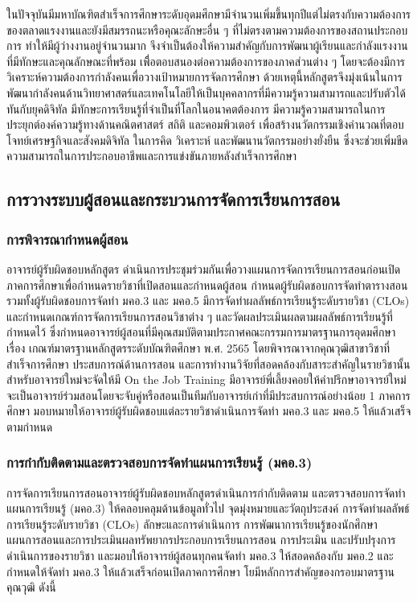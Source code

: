 ในปัจจุบันมีมหาบัณฑิตสำเร็จการศึกษาระดับอุดมศึกษามีจำนวนเพิ่มขึ้นทุกปีแต่ไม่ตรงกับความต้องการของตลาดแรงงานและยังมีสมรรถนะหรือคุณะลักษะอื่น ๆ ที่ไม่ตรงตามความต้องการของสถานประกอบการ ทำให้มีผู้ว่างงานอยู่จำนวนมาก จึงจำเป็นต้องให้ความสำคัญกับการพัฒนาผู้เรียนและกำลังแรงงานที่มีทักษะและคุณลักษณะที่พร้อม เพื่ิอตอบสนองต่อความต้องการของภาคส่วนต่าง ๆ โดยจะต้องมีการวิเคราะห์ความต้องการกำลังคนเพื่อวางเป้าหมายการจัดการศึกษา ด้วยเหตุนี้หลักสูตรจึงมุ่งเน้นในการพัฒนากำลังคนด้านวิทยาศาสตร์และเทคโนโลยีให้เป็นบุคคลากรที่มีความรู้ความสามารถและปรับตัวได้ทันกับยุคดิจิทัล มีทักษะการเรียนรู้ที่จำเป็นที่โลกในอนาคตต้องการ มีความรู้ความสามารถในการประยุกต์องค์ความรู้ทางด้านคณิตศาสตร์ สถิติ และคอมพิวเตอร์ เพื่อสร้างนวัตกรรมเชิงคำนวณที่ตอบโจทย์เศรษฐกิจและสังคมดิจิทัล ในการคิด วิเคราะห์ และพัฒนานวัตกรรมอย่างยั่งยืน ซึ่งจะช่วยเพิ่มขีดความสามารถในการประกอบอาชีพและการแข่งขันภายหลังสำเร็จการศึกษา








\subsection{การวางระบบผู้สอนและกระบวนการจัดการเรียนการสอน}
\subsubsection{การพิจารณากำหนดผู้สอน}
อาจารย์ผู้รับผิดชอบหลักสูตร ดำเนินการประชุมร่วมกันเพื่อวางแผนการจัดการเรียนการสอนก่อนเปิดภาคการศึกษาเพื่อกำหนดรายวิชาที่เปิดสอนและกำหนดผู้สอน กำหนดผู้รับผิดชอบการจัดทำตารางสอน รวมทั้งผู้รับผิดชอบการจัดทำ มคอ.3 และ มคอ.5 มีการจัดทำผลลัพธ์การเรียนรู้ระดับรายวิชา (CLOs) และกำหนดเกณฑ์การจัดการเรียนการสอนวิชาต่าง ๆ และวัดผลประเมินผลตามผลลัพธ์การเรียนรู้ที่กำหนดไว้ ซึ่งกำหนดอาจารย์ผู้สอนที่มีคุณสมบัติตามประกาศคณะกรรมการมาตรฐานการอุดมศึกษา เรื่อง เกณฑ์มาตรฐานหลักสูตรระดับบัณฑิตศึกษา พ.ศ. 2565 โดยพิจารณาจากคุณวุฒิสาขาวิชาที่สำเร็จการศึกษา ประสบการณ์ด้านการสอน และการทำงานวิจัยที่สอดคล้องกับสาระสำคัญในรายวิชานั้น สำหรับอาจารย์ใหม่จะจัดให้มี On the Job Training มีอาจารย์พี่เลี้ยงคอยให้คำปรึกษาอาจารย์ใหม่จะเป็นอาจารย์ร่วมสอนโดยจะจับคู่หรือสอนเป็นทีมกับอาจารย์เก่าที่มีประสบการณ์อย่างน้อย 1 ภาคการศึกษา มอบหมายให้อาจารย์ผู้รับผิดชอบแต่ละรายวิชาดำเนินการจัดทำ มคอ.3 และ มคอ.5 ให้แล้วเสร็จตามกำหนด

\subsubsection{การกำกับติดตามและตรวจสอบการจัดทำแผนการเรียนรู้ (มคอ.3)}
การจัดการเรียนการสอนอาจารย์ผู้รับผิดชอบหลักสูตรดำเนินการกำกับติดตาม และตรวจสอบการจัดทำแผนการเรียนรู้ (มคอ.3) ให้คลอบคลุมด้านข้อมูลทั่วไป จุดมุ่งหมายและวัตถุประสงค์ การจัดทำผลลัพธ์การเรียนรู้ระดับรายวิชา (CLOs) ลักษะและการดำเนินการ การพัฒนาการเรียนรู้ของนักศึกษา แผนการสอนและการประเมินผลทรัพยากรประกอบการเรียนการสอน การประเมิน และปรับปรุงการดำเนินการของรายวิชา และมอบให้อาจารย์ผู้สอนทุกคนจัดทำ มคอ.3 ให้สอดคล้องกับ มคอ.2 และกำหนดให้จัดทำ มคอ.3 ให้แล้วเสร็จก่อนเปิดภาคการศึกษา โยมีหลักการสำคัญของกรอบมาตรฐานคุณวุฒิ ดังนี้

